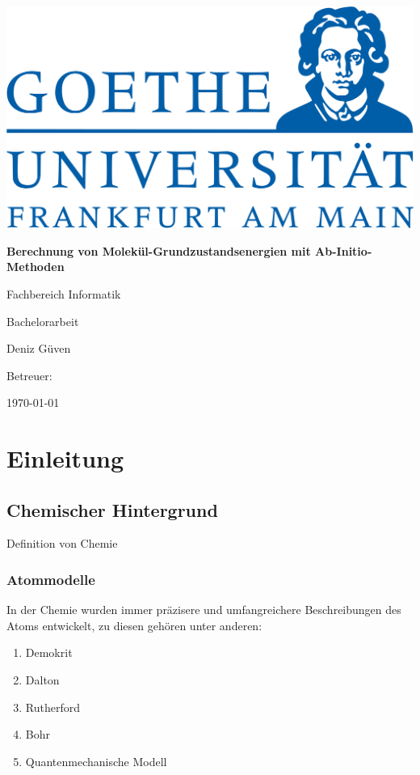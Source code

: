 \documentclass[a4paper, 12pt]{report}
\author{Deniz Güven}
\begin{document}
\begin{titlepage}
  \begin{center}
    \includegraphics[width=0.5\linewidth]{res/uni.png}
    \vspace{2cm}

    \huge{\textbf{Berechnung von Molekül-Grundzustandsenergien 
    mit Ab-Initio-Methoden}}
    \vspace{1cm}

    \Large
    Fachbereich Informatik

    Bachelorarbeit

    Deniz Güven
    \vfill

    Betreuer: 

    \today
  \end{center}
\end{titlepage}

\tableofcontents

\chapter{Einleitung}
\section{Chemischer Hintergrund}

Definition von Chemie

\subsection{Atommodelle}
In der Chemie wurden immer präzisere 
und umfangreichere Beschreibungen des Atoms entwickelt,
zu diesen gehören unter anderen:
\begin{enumerate}
  \item Demokrit
  \item Dalton
  \item Rutherford
  \item Bohr
  \item Quantenmechanische Modell
\end{enumerate}
\end{document}
